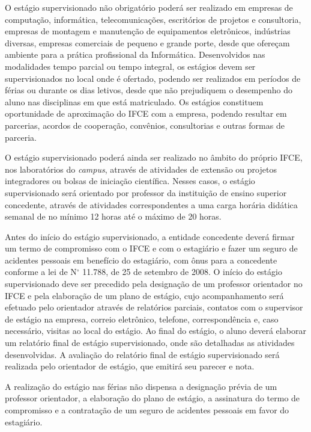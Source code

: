 \documentclass[
	12pt,				%
	openright,			%
	twoside,			%
	a4paper,			%
	chapter=TITLE,		%
	english,			%
	french,				%
	spanish,			%
	brazil,				%
	]{abntex2}
\newcommand{\nord}[1]{N$^\circ$ #1}
\begin{document}
O estágio supervisionado não obrigatório poderá ser realizado em empresas de computação, informática, telecomunicações, escritórios de projetos e consultoria, empresas de montagem e manutenção de equipamentos eletrônicos, indústrias diversas, empresas comerciais de pequeno e grande porte, desde que ofereçam ambiente para a prática profissional da Informática.  Desenvolvidos nas modalidades tempo parcial ou tempo integral, os estágios devem ser supervisionados no local onde é ofertado, podendo ser realizados em períodos de férias ou durante os dias letivos, desde que não prejudiquem o desempenho do aluno nas disciplinas em que está matriculado.
Os estágios constituem oportunidade de aproximação do IFCE com a empresa, podendo resultar em parcerias, acordos de cooperação, convênios, consultorias e outras formas de parceria.


O estágio supervisionado poderá ainda ser realizado no âmbito do próprio IFCE, nos laboratórios do \textit{campus}, através de atividades de extensão ou projetos integradores ou bolsas de iniciação científica. Nesses casos, o estágio supervisionado será orientado por professor da instituição de ensino superior concedente, através de atividades correspondentes a uma carga horária didática semanal de no mínimo 12 horas até o máximo de 20 horas.

Antes do início do estágio supervisionado, a entidade concedente deverá firmar um termo de compromisso com o IFCE e com o estagiário e fazer um seguro de acidentes pessoais em benefício do estagiário, com ônus para a concedente conforme a lei de \nord{11.788}, de 25 de setembro de 2008. O início do estágio supervisionado deve ser precedido pela designação de um professor orientador no IFCE e pela elaboração de um plano de estágio, cujo acompanhamento será efetuado pelo orientador através de relatórios parciais, contatos com o supervisor de estágio na empresa, correio eletrônico, telefone, correspondência e, caso necessário, visitas ao local do estágio. Ao final do estágio, o aluno deverá elaborar um relatório final de estágio supervisionado, onde são detalhadas as atividades desenvolvidas. A avaliação do relatório final de estágio supervisionado será realizada pelo orientador de estágio, que emitirá seu parecer e nota. 

A realização do estágio nas férias não dispensa a designação prévia de um
professor orientador, a elaboração do plano de estágio, a assinatura do termo de compromisso e a contratação de um seguro de acidentes pessoais em favor do estagiário.
\end{document}
